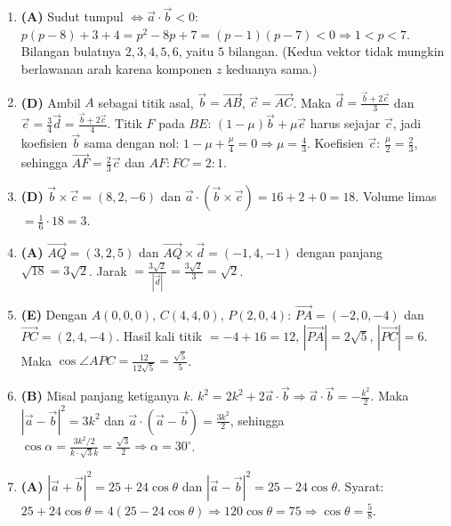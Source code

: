 \documentclass[a4paper,11pt]{article}
\newcommand{\dis}{\displaystyle}
\newcommand{\ov}[1]{\overrightarrow{#1}}
\newcounter{no}
\begin{document}
\begin{enumerate}[leftmargin=2em,itemsep=2pt,topsep=2pt]
\item[\textbf{14.}] \textbf{(A)} Sudut tumpul $\iff\vec a\cdot\vec b<0$: $p(p-8)+3+4=p^{2}-8p+7=(p-1)(p-7)<0\Rightarrow1<p<7$. Bilangan bulatnya $2,3,4,5,6$, yaitu $5$ bilangan. (Kedua vektor tidak mungkin berlawanan arah karena komponen $z$ keduanya sama.)
\item[\textbf{15.}] \textbf{(D)} Ambil $A$ sebagai titik asal, $\vec b=\ov{AB}$, $\vec c=\ov{AC}$. Maka $\vec d=\dis\frac{\vec b+2\vec c}{3}$ dan $\vec e=\dis\frac34\vec d=\dis\frac{\vec b+2\vec c}{4}$. Titik $F$ pada $BE$: $(1-\mu)\vec b+\mu\vec e$ harus sejajar $\vec c$, jadi koefisien $\vec b$ sama dengan nol: $1-\mu+\dis\frac{\mu}{4}=0\Rightarrow\mu=\dis\frac43$. Koefisien $\vec c$: $\dis\frac{\mu}{2}=\dis\frac23$, sehingga $\ov{AF}=\dis\frac23\vec c$ dan $AF:FC=2:1$.
\item[\textbf{16.}] \textbf{(D)} $\vec b\times\vec c=(8,2,-6)$ dan $\vec a\cdot(\vec b\times\vec c)=16+2+0=18$. Volume limas $=\dis\frac16\cdot18=3$.
\item[\textbf{17.}] \textbf{(A)} $\ov{AQ}=(3,2,5)$ dan $\ov{AQ}\times\vec d=(-1,4,-1)$ dengan panjang $\sqrt{18}=3\sqrt2$. Jarak $=\dis\frac{3\sqrt2}{|\vec d|}=\dis\frac{3\sqrt2}{3}=\sqrt2$.
\item[\textbf{18.}] \textbf{(E)} Dengan $A(0,0,0)$, $C(4,4,0)$, $P(2,0,4)$: $\ov{PA}=(-2,0,-4)$ dan $\ov{PC}=(2,4,-4)$. Hasil kali titik $=-4+16=12$, $|\ov{PA}|=2\sqrt5$, $|\ov{PC}|=6$. Maka $\cos\angle APC=\dis\frac{12}{12\sqrt5}=\dis\frac{\sqrt5}{5}$.
\item[\textbf{19.}] \textbf{(B)} Misal panjang ketiganya $k$. $k^{2}=2k^{2}+2\vec a\cdot\vec b\Rightarrow\vec a\cdot\vec b=-\dis\frac{k^{2}}{2}$. Maka $|\vec a-\vec b|^{2}=3k^{2}$ dan $\vec a\cdot(\vec a-\vec b)=\dis\frac{3k^{2}}{2}$, sehingga $\cos\alpha=\dis\frac{3k^{2}/2}{k\cdot\sqrt3k}=\dis\frac{\sqrt3}{2}\Rightarrow\alpha=30^\circ$.
\item[\textbf{20.}] \textbf{(A)} $|\vec a+\vec b|^{2}=25+24\cos\theta$ dan $|\vec a-\vec b|^{2}=25-24\cos\theta$. Syarat: $25+24\cos\theta=4(25-24\cos\theta)\Rightarrow120\cos\theta=75\Rightarrow\cos\theta=\dis\frac58$.
\end{enumerate}
\par{}\par\vspace{0.2em}
\end{document}
